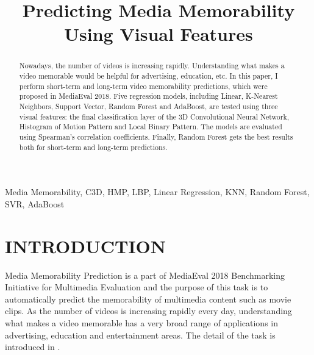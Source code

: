 \documentclass[conference, compsoc]{IEEEtran}
\begin{document}
\title{Predicting Media Memorability Using Visual Features}

\author{
}

\maketitle

\begin{abstract}
Nowadays, the number of videos is increasing rapidly. Understanding what makes a video memorable would be helpful for advertising, education, etc.
In this paper, I perform short-term and long-term video memorability predictions, which were proposed in MediaEval 2018.
Five regression models,
including Linear, K-Nearest Neighbors, Support Vector, Random Forest and AdaBoost,
are tested using three visual features:
the final classification layer of the 3D Convolutional Neural Network, Histogram of Motion Pattern and Local Binary Pattern.
The models are evaluated using Spearman's correlation coefficients.
Finally, Random Forest gets the best results both for short-term and long-term predictions.
\end{abstract}

\begin{IEEEkeywords}
Media Memorability, C3D, HMP, LBP, Linear Regression, KNN, Random Forest, SVR, AdaBoost
\end{IEEEkeywords}


\section{INTRODUCTION}
Media Memorability Prediction is a part of MediaEval 2018 Benchmarking Initiative for Multimedia Evaluation
and the purpose of this task is to automatically predict the memorability of multimedia content such as movie clips.
As the number of videos is increasing rapidly every day, understanding what makes a video memorable has a very broad range of applications in advertising, education and entertainment areas.
The detail of the task is introduced in \cite{DBLP:journals/corr/abs-1807-01052}.
\end{document}
